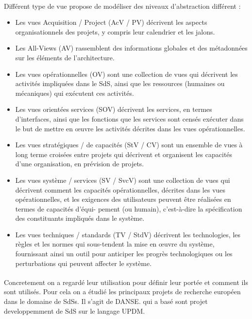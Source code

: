 \paragraph{}
Différent type de vue propose de modéliser des niveaux d'abstraction
différent :
\begin{itemize}
\item Les vues Acquisition / Project (AcV / PV) décrivent les aspects
organisationnels
des projets, y compris leur calendrier et les jalons.
\item Les All-Views (AV) rassemblent des informations globales et des
métadonnées sur
les éléments de l’architecture.
\item Les vues opérationnelles (OV) sont une collection de vues qui
décrivent les activités
impliquées dans le SdS, ainsi que les ressources (humaines ou
mécaniques) qui
exécutent ces activités.
\item Les vues orientées services (SOV) décrivent les services, en termes
d’interfaces,
ainsi que les fonctions que les services sont censés exécuter dans le
but de mettre
en œuvre les activités décrites dans les vues opérationnelles.
\item Les vues stratégiques / de capacités (StV / CV) sont un ensemble de
vues à
long terme croisées entre projets qui décrivent et organisent les
capacités d’une
organisation, en prévision de projets.
\item Les vues système / services (SV / SvcV) sont une collection de vues
qui décrivent
comment les capacités opérationnelles, décrites dans les vues
opérationnelles, et
les exigences des utilisateurs peuvent être réalisées en termes de
capacités d’équi-
pement (ou humain), c’est-à-dire la spécification des constituants
impliqués dans
le système.
\item Les vues techniques / standards (TV / StdV) décrivent les
technologies, les règles
et les normes qui sous-tendent la mise en œuvre du système,
fournissant ainsi un
outil pour anticiper les progrès technologiques ou les perturbations
qui peuvent
affecter le système. 
\end{itemize}

\paragraph{}
Concretement on a regardé leur utilisation pour définir leur portée et
comment ils sont utilisés.  Pour cela on a étudié les principaux
projets de recherche européen
dans le domaine de SdSs. Il s'agit de DANSE. qui a basé sont projet
developpemment de SdS sur le langage UPDM. 

